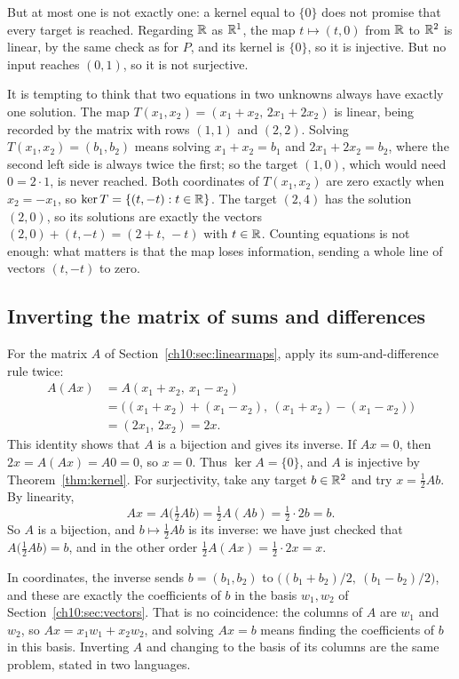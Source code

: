 But at most one is not exactly one: a kernel equal to $\{0\}$ does not promise that every target is reached. Regarding $\mathbb R$ as $\mathbb R^1$, the map $t\mapsto(t,0)$ from $\mathbb R$ to $\mathbb R^2$ is linear, by the same check as for $P$, and its kernel is $\{0\}$, so it is injective. But no input reaches $(0,1)$, so it is not surjective.

It is tempting to think that two equations in two unknowns always have exactly one solution. The map $T(x_1,x_2)=(x_1+x_2,\,2x_1+2x_2)$ is linear, being recorded by the matrix with rows $(1,1)$ and $(2,2)$. Solving $T(x_1,x_2)=(b_1,b_2)$ means solving $x_1+x_2=b_1$ and $2x_1+2x_2=b_2$, where the second left side is always twice the first; so the target $(1,0)$, which would need $0=2\cdot1$, is never reached. Both coordinates of $T(x_1,x_2)$ are zero exactly when $x_2=-x_1$, so $\ker T=\{(t,-t):t\in\mathbb R\}$. The target $(2,4)$ has the solution $(2,0)$, so its solutions are exactly the vectors $(2,0)+(t,-t)=(2+t,\,-t)$ with $t\in\mathbb R$. Counting equations is not enough: what matters is that the map loses information, sending a whole line of vectors $(t,-t)$ to zero.

\subsection*{Inverting the matrix of sums and differences}
For the matrix $A$ of Section~\ref{ch10:sec:linearmaps}, apply its sum-and-difference rule twice:
\begin{align*}
 A(Ax)&=A(x_1+x_2,\ x_1-x_2)\\
 &=\big((x_1+x_2)+(x_1-x_2),\ (x_1+x_2)-(x_1-x_2)\big)\\
 &=(2x_1,\,2x_2)=2x.
\end{align*}
This identity shows that $A$ is a bijection and gives its inverse. If $Ax=0$, then $2x=A(Ax)=A0=0$, so $x=0$. Thus $\ker A=\{0\}$, and $A$ is injective by Theorem~\ref{thm:kernel}. For surjectivity, take any target $b\in\mathbb R^2$ and try $x=\tfrac12Ab$. By linearity,
\[
Ax=A\bigl(\tfrac12Ab\bigr)=\tfrac12A(Ab)=\tfrac12\cdot2b=b.
\]
So $A$ is a bijection, and $b\mapsto\tfrac12Ab$ is its inverse: we have just checked that $A\bigl(\tfrac12Ab\bigr)=b$, and in the other order $\tfrac12A(Ax)=\tfrac12\cdot2x=x$.

In coordinates, the inverse sends $b=(b_1,b_2)$ to $\bigl((b_1+b_2)/2,\ (b_1-b_2)/2\bigr)$, and these are exactly the coefficients of $b$ in the basis $w_1,w_2$ of Section~\ref{ch10:sec:vectors}. That is no coincidence: the columns of $A$ are $w_1$ and $w_2$, so $Ax=x_1w_1+x_2w_2$, and solving $Ax=b$ means finding the coefficients of $b$ in this basis. Inverting $A$ and changing to the basis of its columns are the same problem, stated in two languages.
